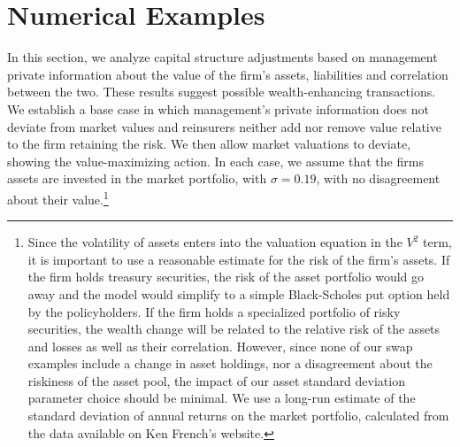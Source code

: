 

\section{Numerical Examples}\label{sec:results}

In this section, we analyze capital structure adjustments based on management private information about the value of the firm's assets, liabilities and correlation between the two.  These results suggest possible wealth-enhancing transactions. We establish a base case in which management's private information does not deviate from market values and reinsurers neither add nor remove value relative to the firm retaining the risk. We then allow market valuations to deviate, showing the value-maximizing action. In each case, we assume that the firms assets are invested in the market portfolio, with $\sigma=0.19$, with no disagreement about their value.\footnote{Since the volatility of assets enters into the valuation equation in the $V^2$ term, it is important to use a reasonable estimate for the risk of the firm's assets.  If the firm holds treasury securities, the risk of the asset portfolio would go away and the model would simplify to a simple Black-Scholes put option held by the policyholders.  If the firm holds a specialized portfolio of risky securities, the wealth change will be related to the relative risk of the assets and losses as well as their correlation. However, since none of our swap examples include a change in asset holdings, nor a disagreement about the riskiness of the asset pool, the impact of our asset standard deviation parameter choice should be minimal.  We use a long-run estimate of the standard deviation of annual returns on the market portfolio, calculated from the data available on Ken French's website.}

